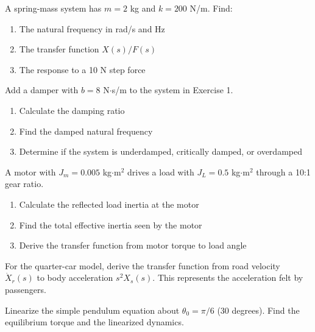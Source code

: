 \begin{exercise}
A spring-mass system has $m = 2$ kg and $k = 200$ N/m. Find:
\begin{enumerate}[label=(\alph*)]
    \item The natural frequency in rad/s and Hz
    \item The transfer function $X(s)/F(s)$
    \item The response to a 10 N step force
\end{enumerate}
\end{exercise}

\begin{exercise}
Add a damper with $b = 8$ N$\cdot$s/m to the system in Exercise 1.
\begin{enumerate}[label=(\alph*)]
    \item Calculate the damping ratio
    \item Find the damped natural frequency
    \item Determine if the system is underdamped, critically damped, or overdamped
\end{enumerate}
\end{exercise}

\begin{exercise}
A motor with $J_m = 0.005$ kg$\cdot$m$^2$ drives a load with $J_L = 0.5$ kg$\cdot$m$^2$ through a 10:1 gear ratio.
\begin{enumerate}[label=(\alph*)]
    \item Calculate the reflected load inertia at the motor
    \item Find the total effective inertia seen by the motor
    \item Derive the transfer function from motor torque to load angle
\end{enumerate}
\end{exercise}

\begin{exercise}
For the quarter-car model, derive the transfer function from road velocity $\dot{X}_r(s)$ to body acceleration $s^2 X_s(s)$. This represents the acceleration felt by passengers.
\end{exercise}

\begin{exercise}
Linearize the simple pendulum equation about $\theta_0 = \pi/6$ (30 degrees). Find the equilibrium torque and the linearized dynamics.
\end{exercise}

